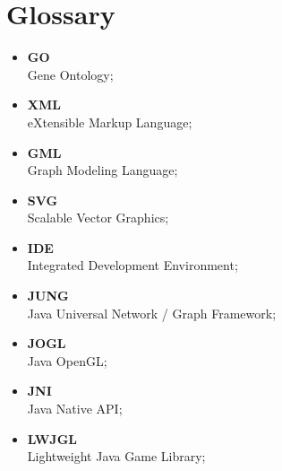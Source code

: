\section*{Glossary}
\label{sec:glossary}

\begin{itemize}
\item {\bf GO} \\ Gene Ontology;
\item {\bf XML} \\ eXtensible Markup Language;
\item {\bf GML} \\ Graph Modeling Language;
\item {\bf SVG} \\ Scalable Vector Graphics;
\item {\bf IDE} \\ Integrated Development Environment;
\item {\bf JUNG} \\ Java Universal Network / Graph Framework;
\item {\bf JOGL} \\ Java OpenGL;
\item {\bf JNI} \\ Java Native API;
\item {\bf LWJGL} \\ Lightweight Java Game Library;
\end{itemize}